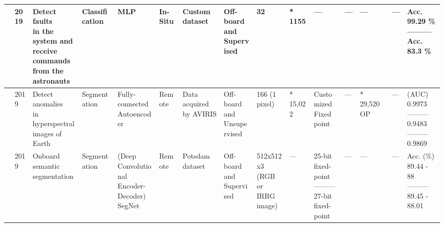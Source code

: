 \begin{center}
{\begin{tabular}{lllllllllllllll}
\cite{kesumaArtificialIntelligenceImplementation2019} & 2019 & \makecell[tl]{Detect faults\\ in the system and\\ receive commands\\ from the astronauts} & Classification & MLP & In-Situ & Custom dataset & \makecell[tl]{Off-board\\ and\\ Supervised} & 32 & * 1155 & --- & --- & --- & --- & \makecell[tl]{Acc. 99.29 \%\\ ---------\\ Acc. 83.3 \%\\}  \\ \hline
\cite{maLightweightHyperspectralImage2019} & 2019 & \makecell[tl]{Detect anomalies\\ in hyperspectral\\ images of Earth} & Segmentation & \makecell[tl]{Fully-connected\\ Autoencoder} & Remote & \makecell[tl]{Data acquired\\ by AVIRIS} & \makecell[tl]{Off-board\\ and\\ Unsupervised} & 166 (1 pixel) & * 15,022 & \makecell[tl]{Customized\\ Fixed point} & --- & * 29,520 OP & --- & \makecell[tl]{(AUC)\\ 0.9973\\ ---------\\ 0.9483\\ ---------\\ 0.9869}  \\ \hline
\cite{sabogalReCoNReconfigurableCNN2019} & 2019 & \makecell[tl]{Onboard semantic\\ segmentation} & Segmentation & \makecell[tl]{(Deep\\ Convolutional\\ Encoder-Decoder)\\ SegNet} & Remote & Potsdam dataset & \makecell[tl]{Off-board\\ and\\ Supervised} & \makecell[tl]{512x512x3\\ (RGB or\\ IRRG image)} & --- & \makecell[tl]{25-bit\\ fixed-point\\ ---------\\ 27-bit\\ fixed-point} & --- & --- & --- & \makecell[tl]{Acc. (\%)\\ 89.44 - 88\\ ---------\\ 89.45 - 88.01}  \\ \hline

\end{tabular}}
\end{center}
